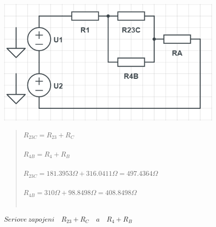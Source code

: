 \begin{figure}[H]
    \includegraphics[scale=0.6]{pic1/u1o3.png}
    \caption{$Seriove \: zapojeni \quad R_{23} + R_C \quad a \quad R_4 + R_B $ }
    \label{fig:Serial_resistor_R23C_and_R4B}
    \begin{quote}
    \centering
    $R_{23C} = R_{23} + R_C $  \\~\\
    $R_{4B} = R_4 + R_B $  \\~\\
    $R_{23C} = 181.3953\Omega + 316.0411\Omega = 497.4364\Omega$ \\~\\
    $R_{4B} =310\Omega + 98.8498\Omega = 408.8498\Omega$ \\~\\
    \end{quote}
\end{figure}
